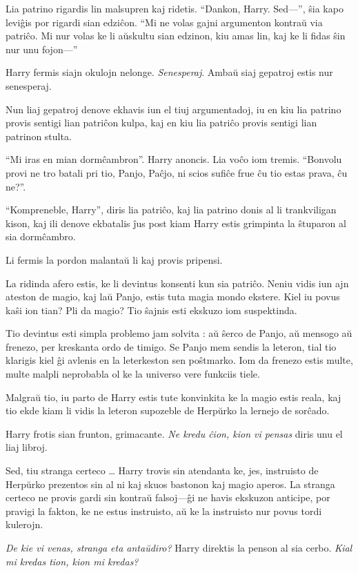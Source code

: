 Lia patrino rigardis lin malsupren kaj ridetis. ``Dankon,
Harry. Sed—'', ŝia kapo leviĝis por rigardi sian edziĉon. ``Mi ne volas
gajni argumenton kontraŭ via patriĉo. Mi nur volas ke li aŭskultu sian
edzinon, kiu amas lin, kaj ke li fidas ŝin nur unu fojon—''

Harry fermis siajn okulojn nelonge. \emph{Senesperaj}. Ambaŭ siaj
gepatroj estis nur senesperaj.

Nun liaj gepatroj denove ekhavis iun el tiuj argumentadoj, iu en kiu
lia patrino provis sentigi lian patriĉon kulpa, kaj en kiu lia patriĉo
provis sentigi lian patrinon stulta.

``Mi iras en mian dormĉambron''. Harry anoncis. Lia voĉo iom
tremis. ``Bonvolu provi ne tro batali pri tio, Panjo, Paĉjo, ni scios
sufiĉe frue ĉu tio estas prava, ĉu ne?''.

``Kompreneble, Harry'', diris lia patriĉo, kaj lia patrino donis al li
trankviligan kison, kaj ili denove ekbatalis ĵus post kiam Harry estis
grimpinta la ŝtuparon al sia dormĉambro.

Li fermis la pordon malantaŭ li kaj provis pripensi.  

La ridinda afero estis, ke li devintus konsenti kun sia patriĉo. Neniu
vidis iun ajn ateston de magio, kaj laŭ Panjo, estis tuta magia
mondo ekstere. Kiel iu povus kaŝi ion tian? Pli da magio? Tio ŝajnis
esti ekskuzo iom suspektinda.

Tio devintus esti simpla problemo jam solvita : aŭ ŝerco de Panjo, aŭ
mensogo aŭ frenezo, per kreskanta ordo de timigo. Se Panjo mem sendis
la leteron, tial tio klarigis kiel ĝi avlenis en la leterkeston sen
poŝtmarko. Iom da frenezo estis multe, multe malpli neprobabla ol ke
la universo vere funkciis tiele.

Malgraŭ tio, iu parto de Harry estis tute konvinkita ke la magio estis
reala, kaj tio ekde kiam li vidis la leteron supozeble de Herpŭrko la
lernejo de sorĉado.

Harry frotis sian frunton, grimacante. \emph{Ne kredu ĉion, kion vi pensas}
diris unu el liaj libroj.

Sed, tiu stranga certeco \ldots{} Harry trovis sin atendanta ke, jes,
instruisto de Herpŭrko prezentos sin al ni kaj skuos bastonon kaj
magio aperos. La stranga certeco ne provis gardi sin kontraŭ falsoj—ĝi
ne havis ekskuzon anticipe, por pravigi la fakton, ke ne estus
instruisto, aŭ ke la instruisto nur povus tordi kulerojn.

\emph{De kie vi venas, stranga eta antaŭdiro?} Harry direktis la penson al sia
cerbo. \emph{Kial mi kredas tion, kion mi kredas?}


